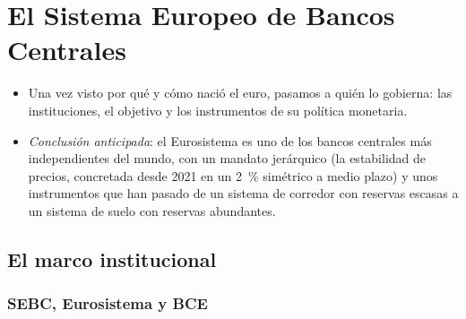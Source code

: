 \documentclass[11pt]{article}
\begin{document}
\section{El Sistema Europeo de Bancos Centrales}\label{sec:sebc}

\begin{itemize}
\item Una vez visto por qué y cómo nació el euro, pasamos a quién lo gobierna: las instituciones, el objetivo y los instrumentos de su política monetaria.
\item \emph{Conclusión anticipada}: el Eurosistema es uno de los bancos centrales más independientes del mundo, con un mandato jerárquico (la estabilidad de precios, concretada desde 2021 en un 2~\% simétrico a medio plazo) y unos instrumentos que han pasado de un sistema de corredor con reservas escasas a un sistema de suelo con reservas abundantes.
\end{itemize}

\subsection{El marco institucional}\label{sec:institucional}

\subsubsection{SEBC, Eurosistema y BCE}\label{sec:sebc-eurosistema}
\end{document}
